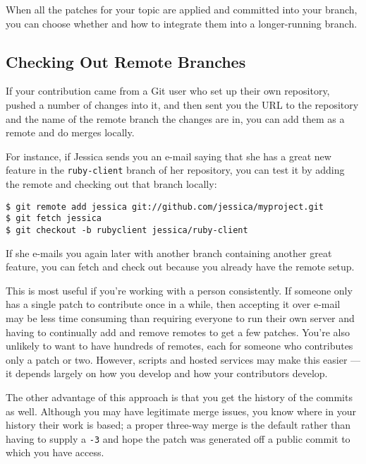 \documentclass[a4paper]{book}
\begin{document}
When all the patches for your topic are applied and committed into your branch, you can choose whether and how to integrate them into a longer-running branch.

\subsection{Checking Out Remote Branches}\label{checking-out-remote-branches}

If your contribution came from a Git user who set up their own repository, pushed a number of changes into it, and then sent you the URL to the repository and the name of the remote branch the changes are in, you can add them as a remote and do merges locally.

For instance, if Jessica sends you an e-mail saying that she has a great new feature in the \texttt{ruby-client} branch of her repository, you can test it by adding the remote and checking out that branch locally:

\begin{shaded}\begin{verbatim}
$ git remote add jessica git://github.com/jessica/myproject.git
$ git fetch jessica
$ git checkout -b rubyclient jessica/ruby-client
\end{verbatim}\end{shaded}

If she e-mails you again later with another branch containing another great feature, you can fetch and check out because you already have the remote setup.

This is most useful if you're working with a person consistently. If someone only has a single patch to contribute once in a while, then accepting it over e-mail may be less time consuming than requiring everyone to run their own server and having to continually add and remove remotes to get a few patches. You're also unlikely to want to have hundreds of remotes, each for someone who contributes only a patch or two. However, scripts and hosted services may make this easier --- it depends largely on how you develop and how your contributors develop.

The other advantage of this approach is that you get the history of the commits as well. Although you may have legitimate merge issues, you know where in your history their work is based; a proper three-way merge is the default rather than having to supply a \texttt{-3} and hope the patch was generated off a public commit to which you have access.
\end{document}
